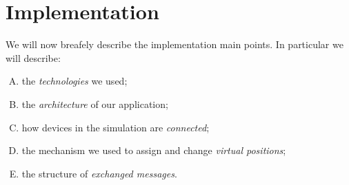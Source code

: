 \section{Implementation}

We will now breafely describe the implementation main points. In particular we will describe:
	\begin{enumerate}[A.]
		\item the \textit{technologies} we used;
		\item the \textit{architecture} of our application;
		\item how devices in the simulation are \textit{connected};
		\item the mechanism we used to assign and change \textit{virtual positions};
		\item the structure of \textit{exchanged messages}.
	\end{enumerate}





